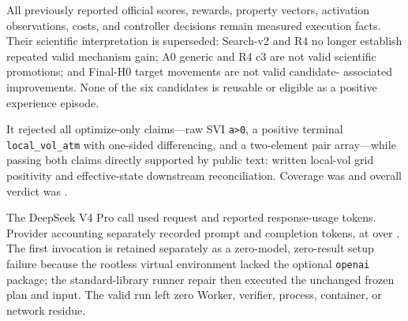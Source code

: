 All previously reported official scores, rewards, property vectors, activation
observations, costs, and controller decisions remain measured execution facts.
Their scientific interpretation is superseded: Search-v2 and R4 no longer
establish repeated valid mechanism gain; A0 generic and R4 c3 are not valid
scientific promotions; and Final-H0 target movements are not valid candidate-
associated improvements. None of the six candidates is reusable or eligible
as a positive experience episode.


 It rejected all
\InfoSetReviewerRejects{} optimize-only claims---raw SVI \texttt{a>0}, a
positive terminal \texttt{local\_vol\_atm} with one-sided differencing, and a
two-element pair array---while passing both \InfoSetReviewerPasses{} claims
directly supported by public text: written local-vol grid positivity and
effective-state downstream reconciliation. Coverage was
\texttt{\InfoSetReviewerCoverage{}} and overall verdict was
\texttt{\InfoSetReviewerOverall{}}.

The DeepSeek V4 Pro call used \InfoSetReviewerRequests{} request and reported
\InfoSetReviewerResponseTokens{} response-usage tokens. Provider accounting
separately recorded \InfoSetReviewerProviderPromptTokens{} prompt and
\InfoSetReviewerProviderCompletionTokens{} completion tokens, at
\InfoSetReviewerCost{} over \InfoSetReviewerWall{}. The first invocation is
retained separately as a zero-model, zero-result setup failure because the
rootless virtual environment lacked the optional \texttt{openai} package; the
standard-library runner repair then executed the unchanged frozen plan and
input. The valid run left zero Worker, verifier, process, container, or network
residue.


